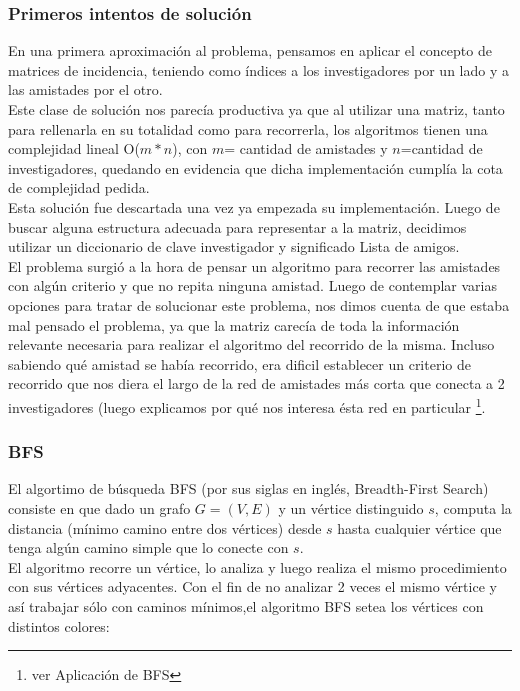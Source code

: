 \subsubsection{Primeros intentos de solución}
\indent En una primera aproximación al problema, pensamos en aplicar el
concepto de matrices de incidencia,
teniendo como índices a los investigadores por un lado y a las amistades por el
otro.\\
\indent Este clase de solución nos parecía productiva ya que al utilizar una
matriz, tanto para rellenarla en su totalidad como para recorrerla, los
algoritmos tienen una complejidad lineal O($m*n$), con $m$= cantidad de
amistades y $n$=cantidad de investigadores, quedando en evidencia que dicha
implementación cumplía la cota de complejidad pedida. \\
\indent Esta solución fue descartada una vez ya empezada su implementación.
Luego de buscar alguna estructura adecuada para representar a la matriz,
decidimos utilizar un diccionario de clave investigador y significado Lista de
amigos.\\
\indent El problema surgió a la hora de pensar un algoritmo para recorrer las
amistades con algún criterio y que no repita ninguna amistad. Luego de
contemplar varias opciones para tratar de solucionar este problema, nos dimos
cuenta de que estaba mal pensado el problema, ya que la matriz carecía de toda la
información relevante necesaria para realizar el algoritmo del recorrido de la
misma. Incluso sabiendo qué amistad se había recorrido, era dificil establecer
un criterio de recorrido que nos diera el largo de la red de amistades más corta
que conecta a 2 investigadores (luego explicamos por qué nos interesa ésta red
en particular \footnote{ver Aplicación de BFS}.

\subsubsection{BFS}
El algortimo de búsqueda BFS (por sus siglas en inglés, Breadth-First Search)
consiste en que dado un grafo $G= (V,E)$ y un vértice distinguido $s$, computa
la distancia (mínimo camino entre dos vértices) desde $s$ hasta cualquier
vértice que tenga algún camino simple que lo conecte con $s$.\\
\indent El algoritmo recorre un vértice, lo analiza y luego realiza el mismo
procedimiento con sus vértices adyacentes. Con el fin de no analizar 2 veces el
mismo vértice y así trabajar sólo con caminos mínimos,el algoritmo BFS setea los
vértices con distintos colores:


